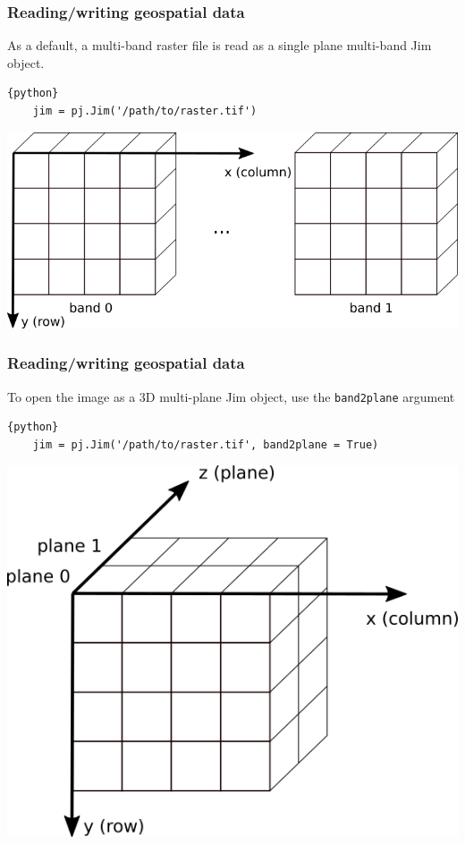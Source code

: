 \documentclass[11pt, handout, aspectratio=169]{beamer}
\begin{document}

\begin{frame}[fragile]
  \frametitle{Reading/writing geospatial data}
  As a default, a multi-band raster file is read as a single plane multi-band Jim object.
  \begin{lstlisting}{python}
    jim = pj.Jim('/path/to/raster.tif')
  \end{lstlisting}

	\begin{center}
		\includegraphics[scale=0.4]{figures/multiband}
	\end{center}
\end{frame}

\begin{frame}[fragile]
  \frametitle{Reading/writing geospatial data}
  \vspace{5mm}
  To open the image as a 3D multi-plane Jim object, use the \lstinline{band2plane} argument
  \begin{lstlisting}{python}
    jim = pj.Jim('/path/to/raster.tif', band2plane = True)
  \end{lstlisting}

	\begin{center}
		\includegraphics[scale=0.4]{figures/multiplane}
	\end{center}
\end{frame}
\end{document}
